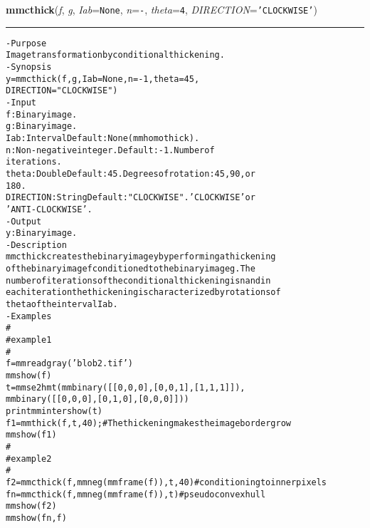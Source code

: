     \begin{boxedminipage}{\textwidth}

    \raggedright \textbf{mmcthick}(\textit{f}, \textit{g}, \textit{Iab}=\texttt{N\-o\-n\-e\-}, \textit{n}=\texttt{-\-}, \textit{theta}=\texttt{4\-}, \textit{DIRECTION}=\texttt{'\-C\-L\-O\-C\-K\-W\-I\-S\-E\-'\-})

    \vspace{-1.5ex}

    \rule{\textwidth}{0.5\fboxrule}
\begin{alltt}
- Purpose
    Image transformation by conditional thickening.
- Synopsis
    y = mmcthick(f, g, Iab=None, n=-1, theta=45,
    DIRECTION="CLOCKWISE")
- Input
    f:         Binary image.
    g:         Binary image.
    Iab:       Interval Default: None (mmhomothick).
    n:         Non-negative integer. Default: -1. Number of
               iterations.
    theta:     Double Default: 45. Degrees of rotation: 45, 90, or
               180.
    DIRECTION: String Default: "CLOCKWISE". 'CLOCKWISE' or
               'ANTI-CLOCKWISE'.
- Output
    y: Binary image.
- Description
    mmcthick creates the binary image y by performing a thickening
    of the binary image f conditioned to the binary image g . The
    number of iterations of the conditional thickening is n and in
    each iteration the thickening is characterized by rotations of
    theta of the interval Iab .
- Examples
    \#
    \#   example 1
    \#
    f=mmreadgray('blob2.tif')
    mmshow(f)
    t=mmse2hmt(mmbinary([[0,0,0],[0,0,1],[1,1,1]]),
                              mmbinary([[0,0,0],[0,1,0],[0,0,0]]))
    print mmintershow(t)
    f1=mmthick(f,t,40); \# The thickening makes the image border grow
    mmshow(f1)
    \#
    \#   example 2
    \#
    f2=mmcthick(f,mmneg(mmframe(f)),t,40) \# conditioning to inner pixels
    fn=mmcthick(f,mmneg(mmframe(f)),t) \#pseudo convex hull
    mmshow(f2)
    mmshow(fn,f)\end{alltt}

    \vspace{1ex}

    \end{boxedminipage}

    \label{multireg:num_pymorph:mmcthin}
    \vspace{0.5ex}

